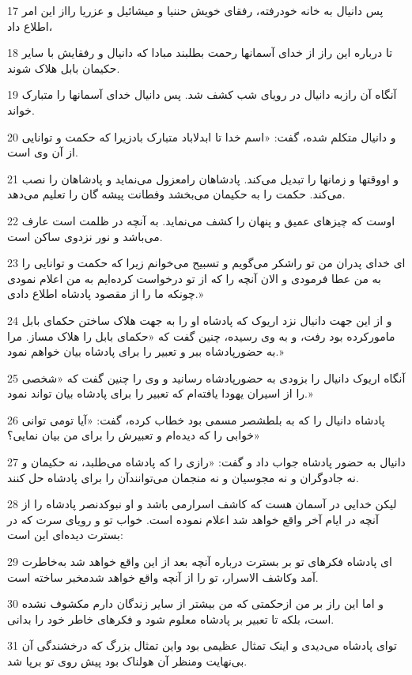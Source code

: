 \par 17 پس دانیال به خانه خودرفته، رفقای خویش حننیا و میشائیل و عزریا رااز این امر اطلاع داد،
\par 18 تا درباره این راز از خدای آسمانها رحمت بطلبند مبادا که دانیال و رفقایش با سایر حکیمان بابل هلاک شوند.
\par 19 آنگاه آن رازبه دانیال در رویای شب کشف شد. پس دانیال خدای آسمانها را متبارک خواند.
\par 20 و دانیال متکلم شده، گفت: «اسم خدا تا ابدلاباد متبارک بادزیرا که حکمت و توانایی از آن وی است.
\par 21 و اووقتها و زمانها را تبدیل می‌کند. پادشاهان رامعزول می‌نماید و پادشاهان را نصب می‌کند. حکمت را به حکیمان می‌بخشد وفطانت پیشه گان را تعلیم می‌دهد.
\par 22 اوست که چیزهای عمیق و پنهان را کشف می‌نماید. به آنچه در ظلمت است عارف می‌باشد و نور نزدوی ساکن است.
\par 23 ‌ای خدای پدران من تو راشکر می‌گویم و تسبیح می‌خوانم زیرا که حکمت و توانایی را به من عطا فرمودی و الان آنچه را که از تو درخواست کرده‌ایم به من اعلام نمودی چونکه ما را از مقصود پادشاه اطلاع دادی.»
\par 24 و از این جهت دانیال نزد اریوک که پادشاه او را به جهت هلاک ساختن حکمای بابل مامورکرده بود رفت، و به وی رسیده، چنین گفت که «حکمای بابل را هلاک مساز. مرا به حضورپادشاه ببر و تعبیر را برای پادشاه بیان خواهم نمود.»
\par 25 آنگاه اریوک دانیال را بزودی به حضورپادشاه رسانید و وی را چنین گفت که «شخصی را از اسیران یهودا یافته‌ام که تعبیر را برای پادشاه بیان تواند نمود.»
\par 26 پادشاه دانیال را که به بلطشصر مسمی بود خطاب کرده، گفت: «آیا تومی توانی خوابی را که دیده‌ام و تعبیرش را برای من بیان نمایی؟»
\par 27 دانیال به حضور پادشاه جواب داد و گفت: «رازی را که پادشاه می‌طلبد، نه حکیمان و نه جادوگران و نه مجوسیان و نه منجمان می‌توانندآن را برای پادشاه حل کنند.
\par 28 لیکن خدایی در آسمان هست که کاشف اسرارمی باشد و او نبوکدنصر پادشاه را از آنچه در ایام آخر واقع خواهد شد اعلام نموده است. خواب تو و رویای سرت که در بسترت دیده‌ای این است:
\par 29 ‌ای پادشاه فکرهای تو بر بسترت درباره آنچه بعد از این واقع خواهد شد به‌خاطرت آمد وکاشف الاسرار، تو را از آنچه واقع خواهد شدمخبر ساخته است.
\par 30 و اما این راز بر من ازحکمتی که من بیشتر از سایر زندگان دارم مکشوف نشده است، بلکه تا تعبیر بر پادشاه معلوم شود و فکرهای خاطر خود را بدانی.
\par 31 توای پادشاه می‌دیدی و اینک تمثال عظیمی بود واین تمثال بزرگ که درخشندگی آن بی‌نهایت ومنظر آن هولناک بود پیش روی تو برپا شد.
